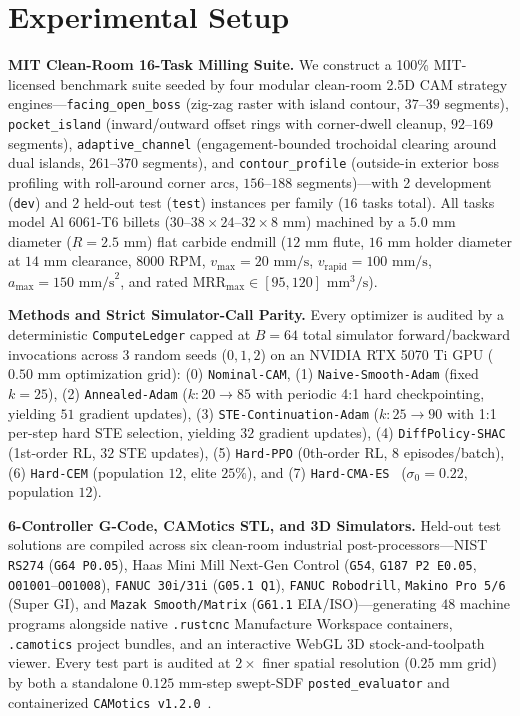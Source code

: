 \documentclass[conference]{IEEEtran}
\begin{document}
\section{Experimental Setup}
\label{sec:setup}

\textbf{MIT Clean-Room 16-Task Milling Suite.}
We construct a 100\% MIT-licensed benchmark suite seeded by four modular clean-room 2.5D CAM strategy engines—\texttt{facing\_open\_boss} (zig-zag raster with island contour, $37$--$39$ segments), \texttt{pocket\_island} (inward/outward offset rings with corner-dwell cleanup, $92$--$169$ segments), \texttt{adaptive\_channel} (engagement-bounded trochoidal clearing around dual islands, $261$--$370$ segments), and \texttt{contour\_profile} (outside-in exterior boss profiling with roll-around corner arcs, $156$--$188$ segments)—with 2 development (\texttt{dev}) and 2 held-out test (\texttt{test}) instances per family ($16$ tasks total). All tasks model Al 6061-T6 billets ($30\text{--}38 \times 24\text{--}32 \times 8\text{ mm}$) machined by a $5.0\text{ mm}$ diameter ($R = 2.5\text{ mm}$) flat carbide endmill ($12\text{ mm}$ flute, $16\text{ mm}$ holder diameter at $14\text{ mm}$ clearance, $8000\text{ RPM}$, $v_{\max} = 20\text{ mm/s}$, $v_{\text{rapid}} = 100\text{ mm/s}$, $a_{\max} = 150\text{ mm/s}^2$, and rated $\text{MRR}_{\max} \in [95, 120]\text{ mm}^3/\text{s}$).

\textbf{Methods and Strict Simulator-Call Parity.}
Every optimizer is audited by a deterministic \texttt{ComputeLedger} capped at $B = 64$ total simulator forward/backward invocations across 3 random seeds ($0, 1, 2$) on an NVIDIA RTX 5070 Ti GPU ($0.50\text{ mm}$ optimization grid): (0) \texttt{Nominal-CAM}, (1) \texttt{Naive-Smooth-Adam} (fixed $k=25$), (2) \texttt{Annealed-Adam} ($k: 20 \to 85$ with periodic 4:1 hard checkpointing, yielding $51$ gradient updates), (3) \texttt{STE-Continuation-Adam} ($k: 25 \to 90$ with 1:1 per-step hard STE selection, yielding $32$ gradient updates), (4) \texttt{DiffPolicy-SHAC} (1st-order RL, $32$ STE updates), (5) \texttt{Hard-PPO} (0th-order RL, $8$ episodes/batch), (6) \texttt{Hard-CEM} (population $12$, elite $25\%$), and (7) \texttt{Hard-CMA-ES}~\cite{hansen2001cmaes} ($\sigma_0 = 0.22$, population $12$).

\textbf{6-Controller G-Code, CAMotics STL, and 3D Simulators.}
Held-out test solutions are compiled across six clean-room industrial post-processors—NIST \texttt{RS274} (\texttt{G64 P0.05}), Haas Mini Mill Next-Gen Control (\texttt{G54}, \texttt{G187 P2 E0.05}, \texttt{O01001}--\texttt{O01008}), \texttt{FANUC 30i/31i} (\texttt{G05.1 Q1}), \texttt{FANUC Robodrill}, \texttt{Makino Pro 5/6} (Super GI), and \texttt{Mazak Smooth/Matrix} (\texttt{G61.1} EIA/ISO)—generating $48$ machine programs alongside native \texttt{.rustcnc} Manufacture Workspace containers, \texttt{.camotics} project bundles, and an interactive WebGL 3D stock-and-toolpath viewer. Every test part is audited at $2\times$ finer spatial resolution ($0.25\text{ mm}$ grid) by both a standalone $0.125\text{ mm}$-step swept-SDF \texttt{posted\_evaluator} and containerized \texttt{CAMotics v1.2.0}~\cite{coffland2021camotics}.
\end{document}
